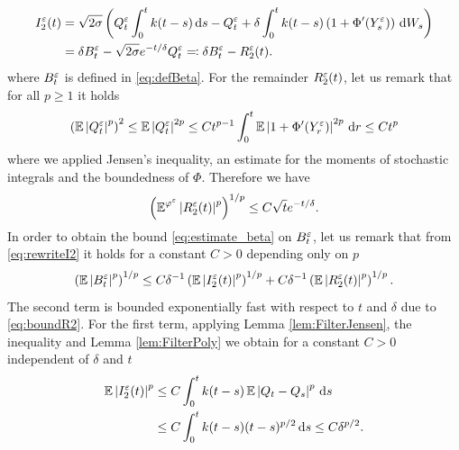 \documentclass[10pt]{article}
\begin{document}
\begin{appendices}
	\begin{equation}\label{eq:rewriteI2}
	\begin{aligned}
		I_2^\varepsilon(t) &= \sqrt{2\sigma} \left(Q_t^\varepsilon\int_0^t k(t-s) \,\mathrm{d} s - Q_t^\varepsilon + \delta \int_0^t k(t-s)\left(1 + \Phi'(Y_s^\varepsilon)\right) \,\mathrm{d} W_s\right)\\
		  			&= \delta B_t^\varepsilon - \sqrt{2\sigma} e^{-t/\delta} Q_t^\varepsilon \eqqcolon \delta B_t^\varepsilon - R_2^\varepsilon(t).
	\end{aligned}
	\end{equation}
	where $B_t^\varepsilon$ is defined in \eqref{eq:defBeta}. For the remainder $R_2^\varepsilon(t)$, let us remark that for all $p \geq 1$ it holds
	\begin{equation}\label{eq:BoundQ}
	\begin{aligned}
		\left(\operatorname{\mathbb{E}}\left\lvert Q_t^\varepsilon\right\rvert^p\right)^2 \leq \operatorname{\mathbb{E}}\left\lvert Q_t^\varepsilon\right\rvert^{2p} \leq Ct^{p-1}\int_0^t \operatorname{\mathbb{E}} \left\lvert1 + \Phi'(Y_r^\varepsilon)\right\rvert^{2p} \,\mathrm{d} r \leq C t^p
	\end{aligned}
	\end{equation}
	where we applied Jensen's inequality, an estimate for the moments of stochastic integrals \cite[Formula (3.25), p. 163]{KaS91} and the boundedness of $\Phi$. Therefore we have
	\begin{equation}\label{eq:boundR2}
		\left( \operatorname{\mathbb{E}}^{\varphi^\varepsilon}\left\lvert R_2^\varepsilon(t)\right\rvert^p \right)^{1/p} \leq C \sqrt{t} e^{-t/\delta}.
	\end{equation}
	In order to obtain the bound \eqref{eq:estimate_beta} on $B_t^\varepsilon$, let us remark that from \eqref{eq:rewriteI2} it holds for a constant $C > 0$ depending only on $p$ 
	\begin{equation}
		\left(\operatorname{\mathbb{E}}\left\lvert B_t^\varepsilon\right\rvert^p\right)^{1/p}\leq C \delta^{-1}\left(\operatorname{\mathbb{E}}\left\lvert I_2^\varepsilon(t)\right\rvert^p\right)^{1/p} + C \delta^{-1} \left(\operatorname{\mathbb{E}}\left\lvert R_2^\varepsilon(t)\right\rvert^p\right)^{1/p}.
	\end{equation}
	The second term is bounded exponentially fast with respect to $t$ and $\delta$ due to \eqref{eq:boundR2}. For the first term, applying Lemma \ref{lem:FilterJensen}, the inequality \cite[Formula (3.25), p. 163]{KaS91} and Lemma \ref{lem:FilterPoly} we obtain for a constant $C > 0$ independent of $\delta$ and $t$
	\begin{equation}
	\begin{aligned}
		\operatorname{\mathbb{E}}\left\lvert I_2^\varepsilon(t)\right\rvert^p &\leq C \int_0^t k(t-s) \operatorname{\mathbb{E}}\left\lvert Q_t - Q_s\right\rvert^p \,\mathrm{d} s \\
		&\leq C\int_0^t k(t-s)(t-s)^{p/2} \,\mathrm{d} s \leq C\delta^{p/2}.
	\end{aligned}
	\end{equation} 

\end{appendices}
\end{document}
